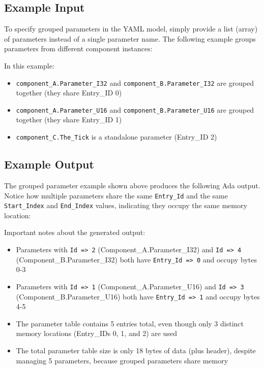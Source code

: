 \subsection{Example Input}

To specify grouped parameters in the YAML model, simply provide a list (array) of parameters instead of a single parameter name. The following example groups parameters from different component instances:


In this example:
\begin{itemize}
\item \texttt{component\_A.Parameter\_I32} and \texttt{component\_B.Parameter\_I32} are grouped together (they share Entry\_ID 0)
\item \texttt{component\_A.Parameter\_U16} and \texttt{component\_B.Parameter\_U16} are grouped together (they share Entry\_ID 1)
\item \texttt{component\_C.The\_Tick} is a standalone parameter (Entry\_ID 2)
\end{itemize}

\subsection{Example Output}

The grouped parameter example shown above produces the following Ada output. Notice how multiple parameters share the same \texttt{Entry\_Id} and the same \texttt{Start\_Index} and \texttt{End\_Index} values, indicating they occupy the same memory location:


Important notes about the generated output:

\begin{itemize}
\item Parameters with \texttt{Id => 2} (Component\_A.Parameter\_I32) and \texttt{Id => 4} (Component\_B.Parameter\_I32) both have \texttt{Entry\_Id => 0} and occupy bytes 0-3
\item Parameters with \texttt{Id => 1} (Component\_A.Parameter\_U16) and \texttt{Id => 3} (Component\_B.Parameter\_U16) both have \texttt{Entry\_Id => 1} and occupy bytes 4-5
\item The parameter table contains 5 entries total, even though only 3 distinct memory locations (Entry\_IDs 0, 1, and 2) are used
\item The total parameter table size is only 18 bytes of data (plus header), despite managing 5 parameters, because grouped parameters share memory
\end{itemize}


